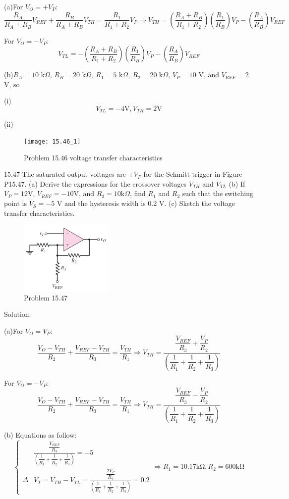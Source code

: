 \documentclass[a4paper,11pt,UTF8]{afthesis}
\begin{document}
(a)For $V_O=+V_P$:
$$
\frac{R_A}{R_A+R_B}V_{REF}+\frac{R_B}{R_A+R_B}V_{TH}=\frac{R_1}{R_1+R_2}V_P\Rightarrow V_{TH}=\left(\frac{R_A+R_B}{R_1+R_2}\right)\left(\frac{R_1}{R_B}\right)V_P-\left(\frac{R_A}{R_B}\right)V_{REF}
$$

For $V_O=-V_P$:
$$
 V_{TL}=-\left(\frac{R_A+R_B}{R_1+R_2}\right)\left(\frac{R_1}{R_B}\right)V_P-\left(\frac{R_A}{R_B}\right)V_{REF}
$$

(b)$R_A=10$ k$\Omega$, $R_B=20$ k$\Omega,\:R_1=5$ k$\Omega,\:R_2=20$ k$\Omega$, $V_P=10$ V, and $V_{\mathrm{REF}}=2$ V, so 

(i)
$$
	V_{TL}=-4\mathrm{V},V_{TH}=2\mathrm{V}
$$

(ii)
\begin{figure}[H]
	\centering
	\texttt{[image: 15.46\_1]}
	\caption{Problem 15.46 voltage transfer characteristics}
\end{figure}

15.47 The saturated output voltages are $\pm V_P$ for the Schmitt trigger in Figure P15.47. (a) Derive the expressions for the crossover voltages $V_{TH}$ and  $V_{TL}$ (b) If $V_P= 12$V, $V_{REF}= - 10$V, and $R_3= 10$k$\Omega$, find $R_1$ and $R_2$ such that the switching point is $V_S=-5$ V and the hysteresis width is 0.2 V. (c) Sketch the voltage transfer characteristics.
\begin{figure}[H]
	\centering
	\includegraphics[width=0.4\textwidth]{15.47}
	\caption{Problem 15.47}
\end{figure}
\noindent Solution:

(a)For $V_O=V_P$:
$$
	\frac{V_O-V_{TH}}{R_2}+\frac{V_{REF}-V_{TH}}{R_3}=\frac{V_{TH}}{R_1}\Rightarrow V_{TH} =\frac{\dfrac{V_{REF}}{R_3}+\dfrac{V_P}{R_2}}{\left(\dfrac1{R_1}+\dfrac1{R_2}+\dfrac1{R_3}\right)}
$$

For $V_O=-V_P$:
$$
\frac{V_O-V_{TH}}{R_2}+\frac{V_{REF}-V_{TH}}{R_3}=\frac{V_{TH}}{R_1}\Rightarrow V_{TH} =\frac{\dfrac{V_{REF}}{R_3}-\dfrac{V_P}{R_2}}{\left(\dfrac1{R_1}+\dfrac1{R_2}+\dfrac1{R_3}\right)}
$$

(b) Equations as follow:
$$
	\left\{\begin{aligned}
		&\frac{\dfrac{V_{REF}}{R_3}}{\left(\dfrac1{R_1}+\dfrac1{R_2}+\dfrac1{R_3}\right)}=-5\\
		\Delta &V_T=V_{TH}-V_{TL}=\frac{\dfrac{2V_P}{R_2}}{\left(\dfrac1{R_1}+\dfrac1{R_2}+\dfrac1{R_3}\right)}=0.2
	\end{aligned}\right.\Rightarrow R_1=10.17\mathrm{k\Omega},R_2=600\mathrm{k\Omega}
$$
\end{document}
